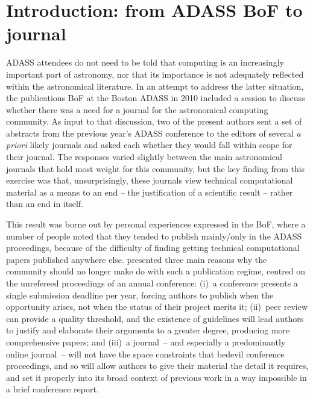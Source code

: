 \section{Introduction: from ADASS BoF to journal}

ADASS attendees do not need to be told that computing is an increasingly important part of astronomy, nor that its importance is not adequately reflected within the astronomical literature. In an attempt to address the latter situation, the publications BoF at the Boston ADASS in 2010 included a session to discuss whether there was a need for a journal for the astronomical computing community. 
As input to that discussion, two of the present authors sent a set of abstracts from the previous year's ADASS conference to the editors of several {\em a priori\/} likely journals and asked each whether they would fall within scope for their journal. The responses \citep[summarised by][]{graymann} varied slightly between the main astronomical journals that hold most weight for this community, but the key finding from this exercise was that, unsurprisingly, these journals view technical computational material as a means to an end -- the justification of a scientific result -- rather than an end in itself. 

This result was borne out by personal experiences expressed in the BoF, where a number of people noted that they tended to publish mainly/only in the ADASS proceedings, because of the difficulty of finding getting technical computational papers published anywhere else. 
\cite{graymann} presented three main reasons why the community should no longer make do
 with such a publication regime, centred on the unrefereed
proceedings of an annual conference: (i)~a conference presents a
single submission deadline per year, forcing authors to publish when
the opportunity arises, not when the status of their project merits
it; (ii)~peer review can provide a quality threshold, and the
existence of guidelines will lead authors to justify and elaborate
their arguments to a greater degree, producing more comprehensive
papers; and (iii)~a journal~-- and especially a predominantly online
journal~-- will not have the space constraints that bedevil conference
proceedings, and so will allow authors to give their material the
detail it requires, and set it properly into its broad context of
previous work in a way impossible in a brief conference
report.

